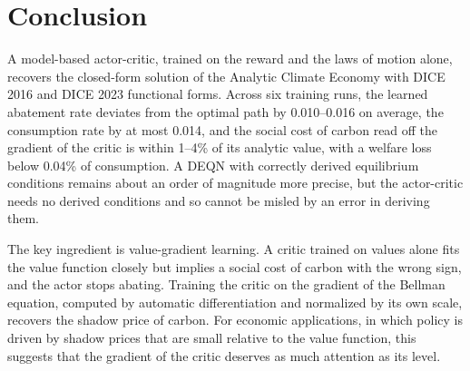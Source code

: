 \section{Conclusion}
\label{sec:conclusion}

A model-based actor-critic, trained on the reward and the laws of motion alone, recovers the closed-form solution of the Analytic Climate Economy with DICE 2016 and DICE 2023 functional forms. Across six training runs, the learned abatement rate deviates from the optimal path by 0.010--0.016 on average, the consumption rate by at most 0.014, and the social cost of carbon read off the gradient of the critic is within 1--4\% of its analytic value, with a welfare loss below 0.04\% of consumption. A DEQN with correctly derived equilibrium conditions remains about an order of magnitude more precise, but the actor-critic needs no derived conditions and so cannot be misled by an error in deriving them.

The key ingredient is value-gradient learning. A critic trained on values alone fits the value function closely but implies a social cost of carbon with the wrong sign, and the actor stops abating. Training the critic on the gradient of the Bellman equation, computed by automatic differentiation and normalized by its own scale, recovers the shadow price of carbon. For economic applications, in which policy is driven by shadow prices that are small relative to the value function, this suggests that the gradient of the critic deserves as much attention as its level.
